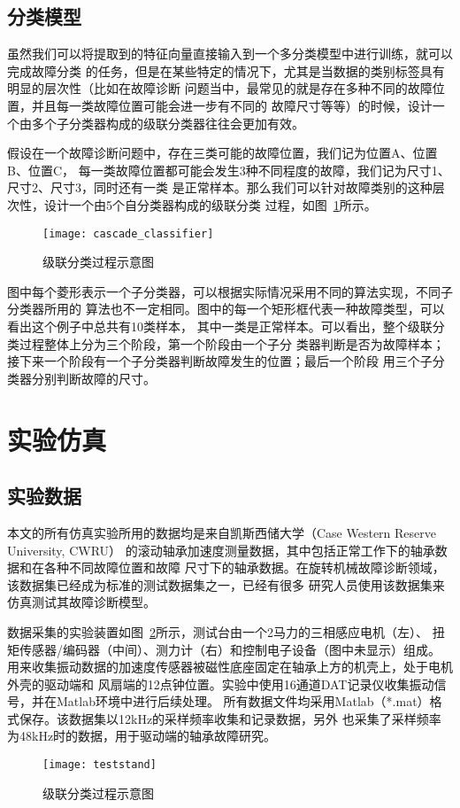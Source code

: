 \subsection{分类模型}
\label{subsection:cascade_model}

虽然我们可以将提取到的特征向量直接输入到一个多分类模型中进行训练，就可以完成故障分类
的任务，但是在某些特定的情况下，尤其是当数据的类别标签具有明显的层次性（比如在故障诊断
问题当中，最常见的就是存在多种不同的故障位置，并且每一类故障位置可能会进一步有不同的
故障尺寸等等）的时候，设计一个由多个子分类器构成的级联分类器往往会更加有效。

假设在一个故障诊断问题中，存在三类可能的故障位置，我们记为位置A、位置B、位置C，
每一类故障位置都可能会发生3种不同程度的故障，我们记为尺寸1、尺寸2、尺寸3，同时还有一类
是正常样本。那么我们可以针对故障类别的这种层次性，设计一个由5个自分类器构成的级联分类
过程，如图~\ref{fig:cascade_classifier}所示。
\begin{figure}[ht] %
  \centering
  \texttt{[image: cascade\_classifier]}
  \caption{级联分类过程示意图}
  \label{fig:cascade_classifier}
\end{figure}

图中每个菱形表示一个子分类器，可以根据实际情况采用不同的算法实现，不同子分类器所用的
算法也不一定相同。图中的每一个矩形框代表一种故障类型，可以看出这个例子中总共有10类样本，
其中一类是正常样本。可以看出，整个级联分类过程整体上分为三个阶段，第一个阶段由一个子分
类器判断是否为故障样本；接下来一个阶段有一个子分类器判断故障发生的位置；最后一个阶段
用三个子分类器分别判断故障的尺寸。

\section{实验仿真}

\subsection{实验数据}

本文的所有仿真实验所用的数据均是来自凯斯西储大学（Case Western Reserve University, CWRU）
的滚动轴承加速度测量数据，其中包括正常工作下的轴承数据和在各种不同故障位置和故障
尺寸下的轴承数据。在旋转机械故障诊断领域，该数据集已经成为标准的测试数据集之一，已经有很多
研究人员使用该数据集来仿真测试其故障诊断模型。

数据采集的实验装置如图~\ref{fig:teststand}所示，测试台由一个2马力的三相感应电机（左）、
扭矩传感器/编码器（中间）、测力计（右）和控制电子设备（图中未显示）组成。 
用来收集振动数据的加速度传感器被磁性底座固定在轴承上方的机壳上，处于电机外壳的驱动端和
风扇端的12点钟位置。实验中使用16通道DAT记录仪收集振动信号，并在Matlab环境中进行后续处理。
所有数据文件均采用Matlab（*.mat）格式保存。该数据集以12kHz的采样频率收集和记录数据，另外
也采集了采样频率为48kHz时的数据，用于驱动端的轴承故障研究。
\begin{figure}[ht] %
  \centering
  \texttt{[image: teststand]}
  \caption{级联分类过程示意图}
  \label{fig:teststand}
\end{figure}


